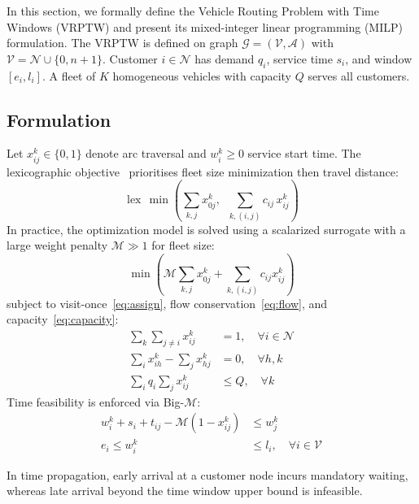 \documentclass[conference]{IEEEtran}
\begin{document}
In this section, we formally define the Vehicle Routing Problem with Time Windows (VRPTW) and present its mixed-integer linear programming (MILP) formulation. The VRPTW is defined on graph $\mathcal{G}=(\mathcal{V},\mathcal{A})$ with
$\mathcal{V}=\mathcal{N}\cup\{0,n{+}1\}$.
Customer $i\in\mathcal{N}$ has demand $q_i$, service time $s_i$, and window
$[e_i,l_i]$.  A fleet of $K$ homogeneous vehicles with capacity $Q$ serves all
customers.

\subsection{Formulation}

Let $x_{ij}^k\in\{0,1\}$ denote arc traversal and $w_i^k\ge0$ service start
time.  The lexicographic objective~\cite{Solomon1987} prioritises fleet size minimization then travel distance:
\begin{equation}
  \operatorname{lex}\,\min \left( \sum_{k,j} x_{0j}^k, \;\; \sum_{k,(i,j)} c_{ij}\,x_{ij}^k \right)
  \label{eq:objective}
\end{equation}
In practice, the optimization model is solved using a scalarized surrogate with a large weight penalty $\mathcal{M} \gg 1$ for fleet size:
\begin{equation}
  \min\left(\mathcal{M}\sum_{k,j} x_{0j}^k + \sum_{k,(i,j)} c_{ij}x_{ij}^k\right)
\end{equation}
subject to visit-once~\eqref{eq:assign}, flow conservation~\eqref{eq:flow},
and capacity~\eqref{eq:capacity}:
\begin{align}
  \textstyle\sum_{k}\sum_{j\neq i}x_{ij}^k &=1,\quad\forall i\in\mathcal{N}
    \label{eq:assign}\\
  \textstyle\sum_{i}x_{ih}^k-\sum_{j}x_{hj}^k &=0,\quad\forall h,k
    \label{eq:flow}\\
  \textstyle\sum_{i}q_i\sum_{j}x_{ij}^k &\le Q,\quad\forall k
    \label{eq:capacity}
\end{align}
Time feasibility is enforced via Big-$\mathcal{M}$:
\begin{align}
  w_i^k+s_i+t_{ij}-\mathcal{M}(1-x_{ij}^k) &\le w_j^k \label{eq:bigM}\\
  e_i \le w_i^k &\le l_i,\quad\forall i\in\mathcal{V} \label{eq:tw}
\end{align}

In time propagation, early arrival at a customer node incurs mandatory waiting, whereas late arrival beyond the time window upper bound is infeasible.
\end{document}
